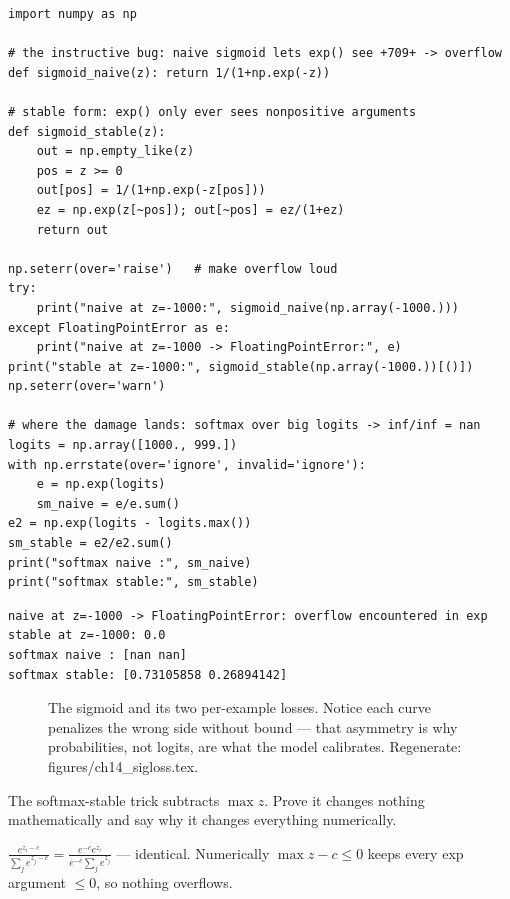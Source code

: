\begin{lstlisting}[caption={\ttfamily code/ch14\_sigmoid.py --- the
instructive bug: naive vs.\ stable sigmoid under extreme logits.}]
import numpy as np

# the instructive bug: naive sigmoid lets exp() see +709+ -> overflow
def sigmoid_naive(z): return 1/(1+np.exp(-z))

# stable form: exp() only ever sees nonpositive arguments
def sigmoid_stable(z):
    out = np.empty_like(z)
    pos = z >= 0
    out[pos] = 1/(1+np.exp(-z[pos]))
    ez = np.exp(z[~pos]); out[~pos] = ez/(1+ez)
    return out

np.seterr(over='raise')   # make overflow loud
try:
    print("naive at z=-1000:", sigmoid_naive(np.array(-1000.)))
except FloatingPointError as e:
    print("naive at z=-1000 -> FloatingPointError:", e)
print("stable at z=-1000:", sigmoid_stable(np.array(-1000.))[()])
np.seterr(over='warn')

# where the damage lands: softmax over big logits -> inf/inf = nan
logits = np.array([1000., 999.])
with np.errstate(over='ignore', invalid='ignore'):
    e = np.exp(logits)
    sm_naive = e/e.sum()
e2 = np.exp(logits - logits.max())
sm_stable = e2/e2.sum()
print("softmax naive :", sm_naive)
print("softmax stable:", sm_stable)
\end{lstlisting}

\begin{lstlisting}[caption={Output of the overflow demo. Notice the
failure mode exactly as advertised: naive \texttt{exp} overflows on
$z=-1000$, and softmax turns it into \texttt{nan/nan}; the stable forms
return $0.0$ and ${[0.731,0.269]}$.}]
naive at z=-1000 -> FloatingPointError: overflow encountered in exp
stable at z=-1000: 0.0
softmax naive : [nan nan]
softmax stable: [0.73105858 0.26894142]
\end{lstlisting}

\begin{figure}[htbp]
\centering

\caption{The sigmoid and its two per-example losses. Notice each curve
penalizes the wrong side without bound --- that asymmetry is why
probabilities, not logits, are what the model calibrates. Regenerate:
\ttfamily figures/ch14\_sigloss.tex.}
\label{fig:sigloss}
\end{figure}

\begin{exercise}[hard]
The softmax-stable trick subtracts $\max z$. Prove it changes nothing
mathematically and say why it changes everything numerically.
\begin{solution}
$\frac{e^{z_i-c}}{\sum_j e^{z_j-c}}=\frac{e^{-c}e^{z_i}}{e^{-c}\sum_j
e^{z_j}}$ --- identical. Numerically $\max z-c\le0$ keeps every exp
argument $\le0$, so nothing overflows.
\end{solution}
\end{exercise}

